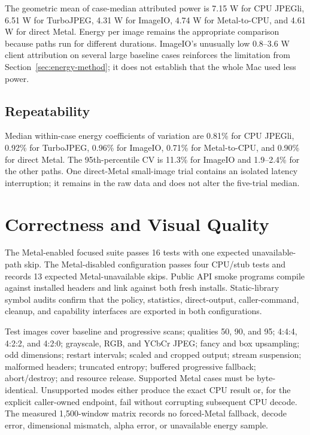 \documentclass[10pt,twocolumn]{article}
\begin{document}
The geometric mean of case-median attributed power is 7.15 W for CPU JPEGli,
6.51 W for TurboJPEG, 4.31 W for ImageIO, 4.74 W for Metal-to-CPU, and 4.61 W
for direct Metal.  Energy per image remains the appropriate comparison because
paths run for different durations.  ImageIO's unusually low 0.8--3.6 W client
attribution on several large baseline cases reinforces the limitation from
Section~\ref{sec:energy-method}; it does not establish that the whole Mac used
less power.

\subsection{Repeatability}

Median within-case energy coefficients of variation are 0.81\% for CPU
JPEGli, 0.92\% for TurboJPEG, 0.96\% for ImageIO, 0.71\% for Metal-to-CPU, and
0.90\% for direct Metal.  The 95th-percentile CV is 11.3\% for ImageIO and
1.9--2.4\% for the other paths.  One direct-Metal small-image trial contains
an isolated latency interruption; it remains in the raw data and does not
alter the five-trial median.

\section{Correctness and Visual Quality}
\label{sec:correctness}

The Metal-enabled focused suite passes 16 tests with one expected
unavailable-path skip.  The Metal-disabled configuration passes four
CPU/stub tests and records 13 expected Metal-unavailable skips.  Public API
smoke programs compile against installed headers and link against both fresh
installs.  Static-library symbol audits confirm that the policy, statistics,
direct-output, caller-command, cleanup, and capability interfaces are exported
in both configurations.

Test images cover baseline and progressive scans; qualities 50, 90, and 95;
4:4:4, 4:2:2, and 4:2:0; grayscale, RGB, and YCbCr JPEG; fancy and box
upsampling; odd dimensions; restart intervals; scaled and cropped output;
stream suspension; malformed headers; truncated entropy; buffered progressive
fallback; abort/destroy; and resource release.  Supported Metal cases must be
byte-identical.  Unsupported modes either produce the exact CPU result or, for
the explicit caller-owned endpoint, fail without corrupting subsequent CPU
decode.  The measured 1,500-window matrix records no forced-Metal fallback,
decode error, dimensional mismatch, alpha error, or unavailable energy sample.
\end{document}
